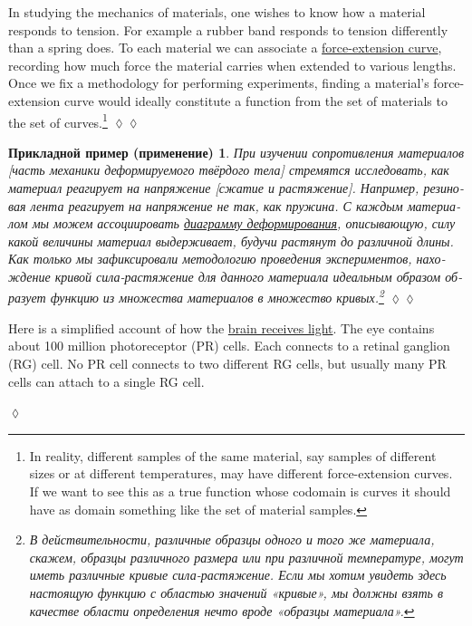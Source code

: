 \documentclass[a4paper]{book}
\theoremstyle{myth}
\newtheorem{excENG}[envENG]{\begin{english}Exercise\end{english}}
\newtheorem{appENG}[envENG]{\begin{english}Application\end{english}}
\newenvironment{exerciseENG}{\begin{excENG}}{\hspace*{\fill}$\lozenge$\end{excENG}}
\newenvironment{applicationENG}{\begin{appENG}}{\hspace*{\fill}$\lozenge\lozenge$\end{appENG}}
\newtheorem{appRUS}[envRUS]{Прикладной пример (применение)}
\newenvironment{applicationRUS}{\begin{appRUS}}{\hspace*{\fill}$\lozenge\lozenge$\end{appRUS}}
\begin{document}
\begin{russian}
\begin{applicationENG}\label{app:force-extension}
In studying the mechanics of materials, one wishes to know how a material responds to tension. For example a rubber band responds to tension differently than a spring does. To each material we can associate a \href{http://en.wikipedia.org/wiki/Stress–strain_curve}{\text force-extension curve}, recording how much force the material carries when extended to various lengths. Once we fix a methodology for performing experiments, finding a material's force-extension curve would ideally constitute a function from the set of materials to the set of curves.\footnote{In reality, different samples of the same material, say samples of different sizes or at different temperatures, may have different force-extension curves. If we want to see this as a true function whose codomain is curves it should have as domain something like the set of material samples.}
\end{applicationENG}

\begin{applicationRUS}\label{app:force-extension}
При изучении сопротивления материалов [часть механики деформируемого твёрдого тела] стремятся исследовать, как материал реагирует на напряжение [сжатие и растяжение]. Например, резиновая лента реагирует на напряжение не так, как пружина. С каждым материалом мы можем ассоциировать \href{https://ru.wikipedia.org/wiki/%D0%94%D0%B8%D0%B0%D0%B3%D1%80%D0%B0%D0%BC%D0%BC%D0%B0_%D0%B4%D0%B5%D1%84%D0%BE%D1%80%D0%BC%D0%B8%D1%80%D0%BE%D0%B2%D0%B0%D0%BD%D0%B8%D1%8F}{\text диаграмму деформирования}, описывающую, силу какой величины материал выдерживает, будучи растянут до различной длины. Как только мы зафиксировали методологию проведения экспериментов, нахождение кривой сила-растяжение для данного материала идеальным образом образует функцию из множества материалов в множество кривых.\footnote{В действительности, различные образцы одного и того же материала, скажем, образцы различного размера или при различной температуре, могут иметь различные кривые сила-растяжение. Если мы хотим увидеть здесь настоящую функцию с областью значений «кривые», мы должны взять в качестве области определения нечто вроде «образцы материала».} 
\end{applicationRUS}

\begin{exerciseENG}
Here is a simplified account of how the \href{http://en.wikipedia.org/wiki/Retina}{\text brain receives light}. The eye contains about 100 million photoreceptor (PR) cells. Each connects to a retinal ganglion (RG) cell. No PR cell connects to two different RG cells, but usually many PR cells can attach to a single RG cell. 


\end{exerciseENG}
\end{russian}
\end{document}
